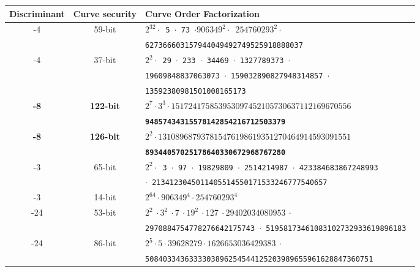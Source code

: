 \documentclass{amsart}
\begin{document}
\begin{table*}[ht]
    \centering\footnotesize
    \begin{tabularx}{\textwidth}{ccl}
        \toprule
                            
        \textbf{Discriminant}    & \textbf{Curve security}  & \textbf{Curve Order Factorization} \\
        \midrule
        -4  &  59-bit & \tt $2^{32} \cdot$ 5 $\cdot$  73 $\cdot 906349^{2} \cdot$ $254760293^{2} \cdot$ \\
                              	&   & \tt  627366603157944049492749525918888037 \\
        -4  &  37-bit & \tt $2^{2} \cdot$ 29 $\cdot$ 233 $\cdot$ 34469 $\cdot$ 1327789373 $\cdot$  \\
         			&   & \tt  19609848837063073 $\cdot$ 159032890827948314857 $\cdot$  \\
                              	&   & \tt  13592380981501008165173 \\
        \textbf{-8}  &   \textbf{122-bit} & \tt  \textbf{$2^{7} \cdot 3^{3} \cdot 151724175853953097452105730637112169670556$} \\
                              	&   & \tt    \textbf{94857434315578142854216712503379} \\
       	\textbf{-8} &   \textbf{126-bit} & \tt  \textbf{$2^{2} \cdot 131089687937815476198619351270464914593091551$}  \\
                              	&   & \tt  \textbf{89344057025178640330672968767280} \\                              
        -3  &   65-bit & \tt $2^{2} \cdot$ 3 $\cdot$ 97 $\cdot$ 19829809 $\cdot$ 2514214987 $\cdot$ 423384683867248993 \\
                              	&   & \tt  $\cdot$ 2134123045011405514550171533246777540657  \\
        -3  &  14-bit & \tt $2^{64} \cdot 906349^{4} \cdot 254760293^{4}$  \\
        -24  &  53-bit & \tt $2^2 ~ \cdot 3^2 ~ \cdot 7 ~ \cdot 19^2 ~ \cdot 127 ~ \cdot 29402034080953  ~ \cdot $  \\
         			&   & \tt  2970884754778276642175743  $\cdot$ 51958173461083102732933619896183  \\    
        -24  &  86-bit & \tt $2^5 \cdot 5 \cdot 39628279 \cdot 1626653036429383 ~ \cdot$  \\
         			&   & \tt  5084033436333303896254544125203989655961628847360751  \\    

\end{tabularx}
\end{table*}
\end{document}
